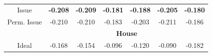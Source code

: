 \documentclass{beamer}
\begin{document}
{\begin{tabular}{|c|cccccc|}
    Issue
    & \hspace{-4pt} \textbf{-0.208} \hspace{-5pt}
    & \hspace{-4pt} \textbf{-0.209} \hspace{-5pt}
    & \hspace{-4pt} \textbf{-0.181} \hspace{-5pt}
    & \hspace{-4pt} \textbf{-0.188} \hspace{-5pt}
    & \hspace{-4pt} \textbf{-0.205} \hspace{-5pt}
    & \hspace{-4pt} \textbf{-0.180} \hspace{-4pt} \\
    \hspace{-5pt} Perm. Issue \hspace{-5pt}
    & \hspace{-4pt} -0.210 \hspace{-5pt}
    & \hspace{-4pt} -0.210 \hspace{-5pt}
    & \hspace{-4pt} -0.183 \hspace{-5pt}
    & \hspace{-4pt} -0.203 \hspace{-5pt}
    & \hspace{-4pt} -0.211 \hspace{-5pt}
    & \hspace{-4pt} -0.186 \hspace{-4pt} \\
    \hline
    \hline
    & \multicolumn{6}{|c|}{\textbf{House}} \\
    \hline
    Ideal & \hspace{-4pt} -0.168 \hspace{-5pt}
    & \hspace{-4pt} -0.154 \hspace{-5pt}
    & \hspace{-4pt} -0.096 \hspace{-5pt}
    & \hspace{-4pt} -0.120 \hspace{-5pt}
    & \hspace{-4pt} -0.090 \hspace{-5pt}
    & \hspace{-4pt} -0.182 \hspace{-4pt} \\

\end{tabular}}
\end{document}

